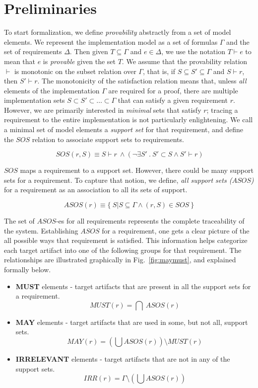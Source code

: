 
\section{Preliminaries}
\label{sec:background}
\newcommand{\satisfies}{\vdash_{\!\!s}}
\newcommand{\nsatisfies}{\nvdash_{\!\!s}}

To start formalization, we define \emph{provability} abstractly from a set of model elements.  We represent the implementation model as a set of formulas $\Gamma$  and the set of requirements $\Delta$.  Then given $T \subseteq \Gamma$ and $e \in \Delta$, we use the notation $T \vdash e$ to mean that $e$ is \emph{provable} given the set $T$.  We assume that the provability relation $\vdash$ is monotonic on the subset relation over $\Gamma$, that is, if $S \subseteq S' \subseteq \Gamma$ and $S \vdash r$, then $S' \vdash r$.  The monotonicity of the satisfaction relation means that, unless {\em all} elements of the implementation $\Gamma$ are required for a proof, there are multiple implementation sets $S \subset S' \subset \ldots \subset \Gamma$ that can satisfy a given requirement $r$.  However, we are primarily interested in {\em minimal} sets that satisfy $r$; tracing a requirement to the entire implementation is not particularly enlightening.  We call a minimal set of model elements a \emph{support set} for that requirement, and define the $SOS$ relation to associate support sets to requirements.

$$ \ SOS(r, S) \equiv S \vdash r~ \land   (\neg\exists S'\ .\ S' \subset S \wedge S' \vdash r) $$

$SOS$ maps a requirement to a support set. However, there could be many support sets for a requirement. To capture that notion, we define, \emph{all support sets ($ASOS$)} for a requirement as an association to all its sets of support.


$$ ASOS(r) \equiv  \{\ S | S \subseteq \Gamma \land (r,S) \in SOS\ \} $$

The set of $ASOS$-es for all requirements represents the complete traceability of the system. Establishing $ASOS$ for a requirement, one gets a clear picture of the all possible ways that requirement is satisfied. This information helps categorize each target artifact into one of the following groups for that requirement.  The relationships are illustrated graphically in Fig.~\ref{fig:maymust}, and explained formally below.

\begin{itemize}
  \item \textbf{MUST} elements - target artifacts that are present in all the support sets for a requirement.
      $$ MUST (r) = \bigcap \ ASOS(r) $$

  \item \textbf{MAY} elements - target artifacts that are used in some, but not all, support sets.
      $$MAY(r) = (\bigcup ASOS (r)) \setminus MUST (r) $$

  \item \textbf{IRRELEVANT} elements - target artifacts that are not in any of the support sets. $$IRR(r) = \Gamma \setminus (\bigcup ASOS (r))$$
\end{itemize}

